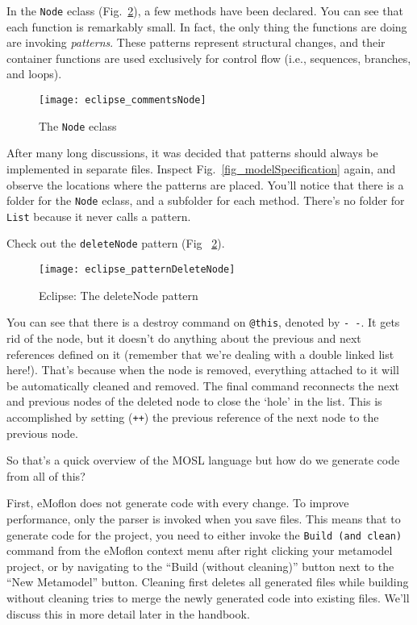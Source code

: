 In the \texttt{Node} eclass (Fig.~\ref{fig_patternDeleteNode}), a few methods have been declared. You can see that each function is remarkably small. In fact,
the only thing the functions are doing are invoking \emph{patterns}. These patterns represent structural changes, and their container functions are used
exclusively for control flow (i.e., sequences, branches, and loops).

 \begin{figure}[htbp]
  \centering
  \texttt{[image: eclipse\_commentsNode]}
  \caption{The \texttt{Node} eclass}
  \label{fig_eclassNode}
\end{figure}

After many long discussions, it was decided that patterns should always be implemented in separate files. Inspect Fig.~\ref{fig_modelSpecification} again, and
observe the locations where the patterns are placed. You'll notice that there is a folder for the \texttt{Node} eclass, and a subfolder for each method. There's
no folder for \texttt{List} because it never calls a pattern.

Check out the \texttt{deleteNode} pattern (Fig ~\ref{fig_patternDeleteNode}).

 \begin{figure}[htbp]
  \centering
  \texttt{[image: eclipse\_patternDeleteNode]}
  \caption{Eclipse: The deleteNode pattern}
  \label{fig_patternDeleteNode}
\end{figure}

You can see that there is a destroy command on \texttt{@this}, denoted by \texttt{-~-}. It gets rid of the node, but it doesn't do anything about the previous
and next references defined on it (remember that we're dealing with a double linked list here!). That's because when the node is removed, everything attached to it
will be automatically cleaned and removed. The final command reconnects the next and previous nodes of the deleted node to close the `hole' in the list. This is
accomplished by setting (\texttt{++}) the previous reference of the next node to the previous node.
 
So that's a quick overview of the MOSL language but how do we generate code from all of this?

First, eMoflon does not generate code with every change. To improve performance, only the parser is invoked when you save files. This means
that to generate code for the project, you need to either invoke the \texttt{Build (and clean)} command from the eMoflon context menu after right clicking your
metamodel project, or by navigating to the ``Build (without cleaning)'' button next to the ``New Metamodel'' button. Cleaning first deletes all generated files
while building without cleaning tries to merge the newly generated code into existing files. We'll discuss this in more detail later in the handbook.
